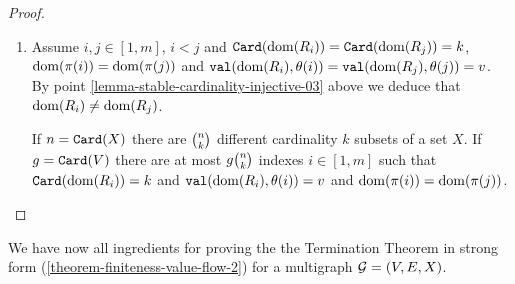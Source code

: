 \documentclass{lmcs}
\begin{document}
\begin{proof}
\begin{enumerate}

\item
Assume $i,j \in[1,m]$, $i < j$ and ${\tt Card}({\rm dom}(R_i))={\tt Card}({\rm dom}(R_j))=k$,
${\rm dom}(\pi(i)) = {\rm dom}(\pi(j))$
and ${\tt val}({\rm dom}(R_i),\theta(i))={\tt val}({\rm dom}(R_j),\theta(j))=v$.
By point \ref{lemma-stable-cardinality-injective-03} above
we deduce that ${\rm dom}(R_i) \not = {\rm dom}(R_j)$.

If $n = {\tt Card}(X)$ there are $\newton{n}{k}$ 
different cardinality $k$ subsets of a set $X$. 
If $g={\tt Card}(V)$ there are at most $g\newton{n}{k}$ indexes 
$i\in[1,m]$ such that ${\tt Card}({\rm dom}(R_i))=k$
and ${\tt val}({\rm dom}(R_i),\theta(i))=v$ and 
${\rm dom}(\pi(i)) = {\rm dom}(\pi(j))$. 

\end{enumerate}
\end{proof}

We have now all ingredients for proving the the Termination Theorem
in strong form (\ref{theorem-finiteness-value-flow-2}) for a multigraph ${\mathcal G}=(V,E,X)$.
\\
\end{document}
